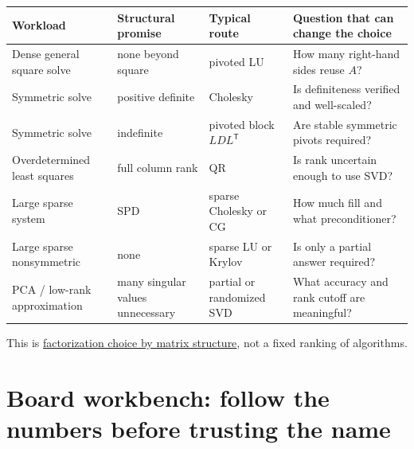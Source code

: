 {\def\LTcaptype{none} %
\begin{longtable}[]{@{}
  >{\raggedright\arraybackslash}p{}
  >{\raggedright\arraybackslash}p{}
  >{\raggedright\arraybackslash}p{}
  >{\raggedright\arraybackslash}p{}@{}}
\toprule\noalign{}
\begin{minipage}[b]{\linewidth}\raggedright
Workload
\end{minipage} & \begin{minipage}[b]{\linewidth}\raggedright
Structural promise
\end{minipage} & \begin{minipage}[b]{\linewidth}\raggedright
Typical route
\end{minipage} & \begin{minipage}[b]{\linewidth}\raggedright
Question that can change the choice
\end{minipage} \\
\midrule\noalign{}
\endhead
\bottomrule\noalign{}
\endlastfoot
Dense general square solve & none beyond square & pivoted LU & How many right-hand sides reuse \(A\)? \\
Symmetric solve & positive definite & Cholesky & Is definiteness verified and well-scaled? \\
Symmetric solve & indefinite & pivoted block \(LDL^\mathsf T\) & Are stable symmetric pivots required? \\
Overdetermined least squares & full column rank & QR & Is rank uncertain enough to use SVD? \\
Large sparse system & SPD & sparse Cholesky or CG & How much fill and what preconditioner? \\
Large sparse nonsymmetric & none & sparse LU or Krylov & Is only a partial answer required? \\
PCA / low-rank approximation & many singular values unnecessary & partial or randomized SVD & What accuracy and rank cutoff are meaningful? \\
\end{longtable}
}

This is \hyperref[02-foundations-ii-ch038-choose-a-factorization-from-structure-and-the-requested-answer]{factorization choice by matrix structure}, not a fixed ranking of algorithms.

\section{Board workbench: follow the numbers before trusting the name}\label{02-foundations-ii-ch038-board-workbench-follow-the-numbers-before-trusting-the-name}

